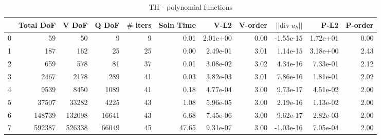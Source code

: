\documentclass[12pt]{extarticle}
\numberwithin{equation}{section}    %
\begin{document}
\pagestyle{fancyplain}
\fancyhead{}
\fancyfoot{} %
\fancyfoot[LE,RO]{\thepage \hspace{-5mm}}
\fancyfoot[CO,RE]{}
\begin{landscape}


\begin{table}

\begin{tabular}{lrrrrrrrrrr}
\hline
{} &  Total DoF &   V DoF &  Q DoF &  $\#$ iters &  Soln Time &      V-L2 &  V-order &  $||\mbox{div} \ u_h||$ &      P-L2 &  P-order \\
\hline
0 &         59 &      50 &      9 &        9 &       0.01 &  2.01e+00 &     0.00 &    -1.55e-15 &  1.72e+01 &     0.00 \\
1 &        187 &     162 &     25 &       25 &       0.00 &  2.49e-01 &     3.01 &     1.14e-15 &  3.18e+00 &     2.43 \\
2 &        659 &     578 &     81 &       37 &       0.01 &  3.08e-02 &     3.02 &     4.34e-16 &  7.33e-01 &     2.12 \\
3 &       2467 &    2178 &    289 &       41 &       0.03 &  3.82e-03 &     3.01 &     7.86e-16 &  1.81e-01 &     2.02 \\
4 &       9539 &    8450 &   1089 &       41 &       0.18 &  4.77e-04 &     3.00 &     9.73e-17 &  4.51e-02 &     2.00 \\
5 &      37507 &   33282 &   4225 &       43 &       1.08 &  5.96e-05 &     3.00 &     2.19e-16 &  1.13e-02 &     2.00 \\
6 &     148739 &  132098 &  16641 &       43 &       6.68 &  7.45e-06 &     3.00 &     9.62e-17 &  2.82e-03 &     2.00 \\
7 &     592387 &  526338 &  66049 &       45 &      47.65 &  9.31e-07 &     3.00 &    -1.03e-16 &  7.05e-04 &     2.00 \\
\hline
\end{tabular}

\caption{TH - polynomial functions}
\end{table}


\begin{table}


\end{table}
\end{landscape}
\end{document}
